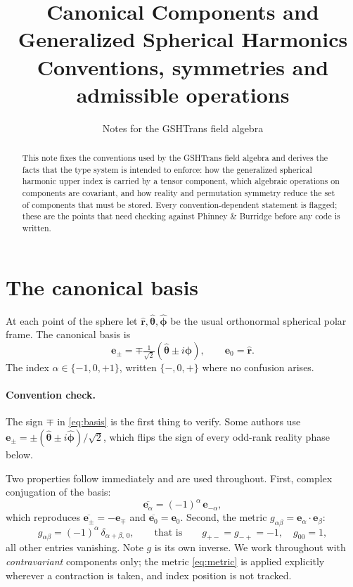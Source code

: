 \documentclass[11pt,a4paper]{article}
\title{Canonical Components and Generalized Spherical Harmonics\\
\large Conventions, symmetries and admissible operations}
\author{Notes for the GSHTrans field algebra}
\date{}
\newcommand{\ebasis}[1]{\mathbf{e}_{#1}}
\newcommand{\conj}[1]{\overline{#1}}
\begin{document}
\maketitle

\begin{abstract}
This note fixes the conventions used by the GSHTrans field algebra and
derives the facts that the type system is intended to enforce: how the
generalized spherical harmonic upper index is carried by a tensor
component, which algebraic operations on components are covariant, and
how reality and permutation symmetry reduce the set of components that
must be stored.  Every convention-dependent statement is flagged; these
are the points that need checking against Phinney \& Burridge before any
code is written.
\end{abstract}

\tableofcontents

\section{The canonical basis}
\label{sec:basis}

At each point of the sphere let $\hat{\mathbf{r}},
\hat{\boldsymbol{\theta}}, \hat{\boldsymbol{\phi}}$ be the usual
orthonormal spherical polar frame.  The canonical basis is
\begin{equation}
  \ebasis{\pm} = \mp \tfrac{1}{\sqrt{2}}
    \left( \hat{\boldsymbol{\theta}} \pm i \hat{\boldsymbol{\phi}} \right),
  \qquad
  \ebasis{0} = \hat{\mathbf{r}} .
  \label{eq:basis}
\end{equation}
The index $\alpha \in \{-1, 0, +1\}$, written $\{-,0,+\}$ where no
confusion arises.

\paragraph{Convention check.}  The sign $\mp$ in \eqref{eq:basis} is the
first thing to verify.  Some authors use $\ebasis{\pm} = \pm(\hat{\boldsymbol{\theta}}
\pm i\hat{\boldsymbol{\phi}})/\sqrt{2}$, which flips the sign of every
odd-rank reality phase below.

Two properties follow immediately and are used throughout.  First, complex
conjugation of the basis:
\begin{equation}
  \conj{\ebasis{\alpha}} = (-1)^{\alpha}\, \ebasis{-\alpha},
  \label{eq:basisconj}
\end{equation}
which reproduces $\conj{\ebasis{\pm}} = -\ebasis{\mp}$ and
$\conj{\ebasis{0}} = \ebasis{0}$.  Second, the metric
$g_{\alpha\beta} = \ebasis{\alpha} \cdot \ebasis{\beta}$:
\begin{equation}
  g_{\alpha\beta} = (-1)^{\alpha}\, \delta_{\alpha+\beta,\,0},
  \qquad\text{that is}\qquad
  g_{+-} = g_{-+} = -1, \quad g_{00} = 1,
  \label{eq:metric}
\end{equation}
all other entries vanishing.  Note $g$ is its own inverse.  We work
throughout with \emph{contravariant} components only; the metric
\eqref{eq:metric} is applied explicitly wherever a contraction is taken,
and index position is not tracked.
\end{document}
